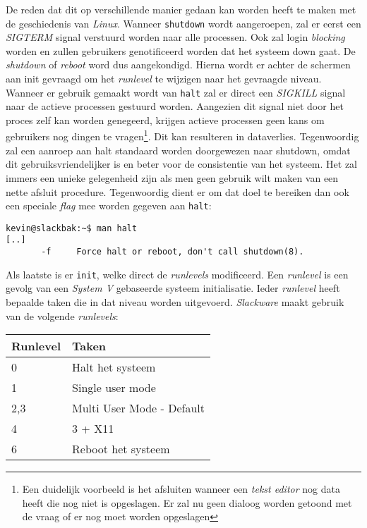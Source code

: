 De reden dat dit op verschillende manier gedaan kan worden heeft te maken met de geschiedenis van \emph{Linux}. Wanneer \texttt{shutdown} wordt aangeroepen, zal er eerst een \emph{SIGTERM} signal verstuurd worden naar alle processen. Ook zal login \emph{blocking} worden en zullen gebruikers genotificeerd worden dat het systeem down gaat. De \emph{shutdown} of \emph{reboot} word dus aangekondigd. Hierna wordt er achter de schermen aan init gevraagd om het \emph{runlevel} te wijzigen naar het gevraagde niveau. Wanneer er gebruik gemaakt wordt van \texttt{halt} zal er direct een \emph{SIGKILL} signal naar de actieve processen gestuurd worden. Aangezien dit signal niet door het proces zelf kan worden genegeerd, krijgen actieve processen geen kans om gebruikers nog dingen te vragen\footnote{Een duidelijk voorbeeld is het afsluiten wanneer een \emph{tekst editor} nog data heeft die nog niet is opgeslagen. Er zal nu geen dialoog worden getoond met de vraag of er nog moet worden opgeslagen}. Dit kan resulteren in dataverlies. Tegenwoordig zal een aanroep aan halt standaard worden doorgewezen naar shutdown, omdat dit gebruiksvriendelijker is en beter voor de consistentie van het systeem. Het zal immers een unieke gelegenheid zijn als men geen gebruik wilt maken van een nette afsluit procedure. Tegenwoordig dient er om dat doel te bereiken dan ook een speciale \emph{flag} mee worden gegeven aan \texttt{halt}:
\begin{lstlisting}
kevin@slackbak:~$ man halt
[..]
       -f     Force halt or reboot, don't call shutdown(8).
\end{lstlisting}%

Als laatste is er \texttt{init}, welke direct de \emph{runlevels} modificeerd. Een \emph{runlevel} is een gevolg van een \emph{System V} gebaseerde systeem initialisatie. Ieder \emph{runlevel} heeft bepaalde taken die in dat niveau worden uitgevoerd. \emph{Slackware} maakt gebruik van de volgende \emph{runlevels}: 

\begin{tabular}[t]{ll}
  \hline
  Runlevel & Taken\\
  \hline
  0 & Halt het systeem\\
  1 & Single user mode\\
  2,3 & Multi User Mode - Default\\
  4 & 3 + X11\\
  6 & Reboot het systeem\\
\end{tabular}

